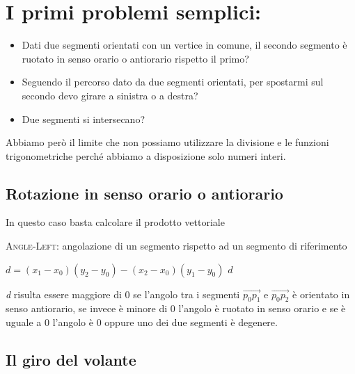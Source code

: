 \section{I primi problemi semplici:}\label{la-soluzione-ai-semplici-problemi}



\begin{itemize}
	\item
	Dati due segmenti orientati con un vertice in comune, il secondo segmento è ruotato in senso orario o antiorario rispetto il primo?
	\item
	Seguendo il percorso dato da due segmenti orientati, per spostarmi sul secondo devo girare a sinistra o a destra?
	\item
	Due segmenti si intersecano?
\end{itemize}

Abbiamo però il limite che non possiamo utilizzare la divisione e le funzioni trigonometriche perché abbiamo a disposizione solo numeri interi.


\subsection{Rotazione in senso orario o antiorario}\label{rotazione-in-senso-orario-o-antiorario}

In questo caso basta calcolare il prodotto vettoriale

\begin{breakablealgorithm}
	\caption{\textsc{Angle-Left}: angolazione di un segmento rispetto ad un segmento di riferimento}
	\begin{algorithmic}[1]
			\State $d = (x_1-x_0)(y_2-y_0) - (x_2-x_0)(y_1-y_0)$
			\State \Return $d$
		\EndFunction
	\end{algorithmic}
\end{breakablealgorithm}

\emph{d} risulta essere maggiore di 0 se l'angolo tra i segmenti $\overrightarrow{p_0p_1}$ e $\overrightarrow{p_0p_2}$ è orientato in senso antiorario, se invece è minore di 0 l'angolo è
ruotato in senso orario e se è uguale a 0 l'angolo è 0 oppure uno dei
due segmenti è degenere.

\subsection{Il giro del volante}\label{il-giro-del-volante}

